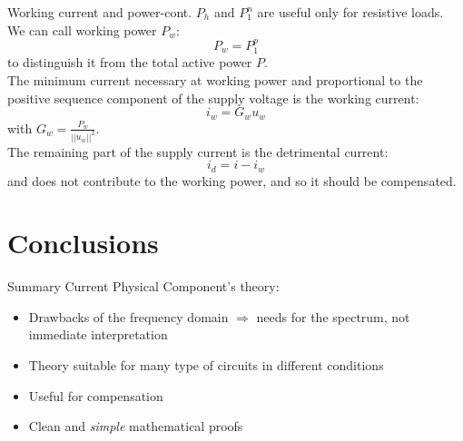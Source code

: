 \documentclass[aspectratio=169]{beamer}
\begin{document}
  \begin{frame}{Working current and power-cont.}{\insertsection}
    $P_h$ and $P_1^n$ are useful only for resistive loads. \\
    We can call \textcolor{NTNU_orange}{working power $P_w$}:
    \begin{equation}
      P_w = P_{1}^{p} 
    \end{equation}  
    to distinguish it from the total \textcolor{NTNU_green}{active power $P$}.\\
    The minimum current necessary at working power and proportional to the positive sequence component of the supply voltage is the \textcolor{NTNU_orange}{working current}:
    \begin{equation}
      \pmb{\mathit{i}}_w = G_w \pmb{\mathit{u}}_w
    \end{equation}
    with $G_w=\frac{P_w}{||\pmb{\mathit{u}}_w||^2}$.\\
    The remaining part of the supply current is the \textcolor{NTNU_orange}{detrimental current}:
    \begin{equation}
      \pmb{\mathit{i}}_d = \pmb{\mathit{i}} - \pmb{\mathit{i}}_w
    \end{equation}
    and does not contribute to the working power, and so it should be compensated.
  \end{frame}


    \section{Conclusions}
    \begin{frame}{Summary}
    Current Physical Component's theory:
        \begin{itemize}
            \item Drawbacks of the frequency domain $\Rightarrow$ needs for the spectrum, not immediate interpretation
            \item Theory suitable for many type of circuits in different conditions
            \item Useful for compensation
            \item Clean and \textit{simple} mathematical proofs
        \end{itemize}
    \end{frame}
\end{document}
